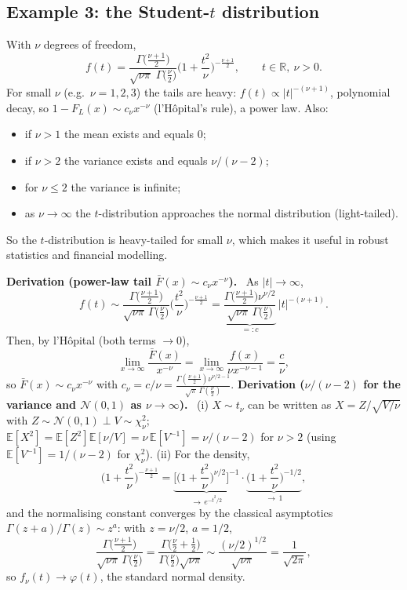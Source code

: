 \documentclass[11pt,a4paper]{article}
\newcommand{\real}{\mathbb{R}}
\newcommand{\E}{\mathbb{E}}
\newcommand{\N}{\mathcal{N}}
\newcommand{\der}[1]{\medskip\noindent\textbf{Derivation (#1).}\ }
\begin{document}
\subsection{Example 3: the Student-$t$ distribution}
With $\nu$ degrees of freedom,
\[
  f(t)=\frac{\Gamma\big(\frac{\nu+1}{2}\big)}{\sqrt{\nu\pi}\;\Gamma\big(\frac{\nu}{2}\big)}
        \Big(1+\frac{t^2}{\nu}\Big)^{-\frac{\nu+1}{2}},\qquad t\in\real,\ \nu>0 .
\]
For small $\nu$ (e.g.\ $\nu=1,2,3$) the tails are heavy: $f(t)\propto|t|^{-(\nu+1)}$, polynomial
decay, so $1-F_L(x)\sim c_\nu x^{-\nu}$ (l'H\^opital's rule), a power law. Also:
\begin{itemize}[nosep]
  \item if $\nu>1$ the mean exists and equals $0$;
  \item if $\nu>2$ the variance exists and equals $\nu/(\nu-2)$;
  \item for $\nu\le2$ the variance is infinite;
  \item as $\nu\to\infty$ the $t$-distribution approaches the normal distribution (light-tailed).
\end{itemize}
So the $t$-distribution is heavy-tailed for small $\nu$, which makes it useful in robust statistics and
financial modelling.

\der{power-law tail $\bar F(x)\sim c_\nu x^{-\nu}$}
As $|t|\to\infty$,
\[
  f(t)\sim\frac{\Gamma\big(\frac{\nu+1}{2}\big)}{\sqrt{\nu\pi}\,\Gamma\big(\frac\nu2\big)}
        \Big(\frac{t^2}{\nu}\Big)^{-\frac{\nu+1}{2}}
       =\underbrace{\frac{\Gamma\big(\frac{\nu+1}{2}\big)\nu^{\nu/2}}
                       {\sqrt{\nu\pi}\,\Gamma\big(\frac\nu2\big)}}_{=:c}
        \,|t|^{-(\nu+1)} .
\]
Then, by l'H\^opital (both terms $\to0$),
\[
  \lim_{x\to\infty}\frac{\bar F(x)}{x^{-\nu}}
   =\lim_{x\to\infty}\frac{f(x)}{\nu x^{-\nu-1}}
   =\frac{c}{\nu},
\]
so $\bar F(x)\sim c_\nu x^{-\nu}$ with $c_\nu=c/\nu
=\frac{\Gamma(\frac{\nu+1}{2})\nu^{\nu/2-1}}{\sqrt{\pi}\,\Gamma(\frac\nu2)}$.
\der{$\nu/(\nu-2)$ for the variance and $\N(0,1)$ as $\nu\to\infty$}
(i) $X\sim t_\nu$ can be written as $X=Z/\sqrt{V/\nu}$ with $Z\sim\N(0,1)\perp V\sim\chi^2_\nu$;
$\E[X^2]=\E[Z^2]\E[\nu/V]=\nu\,\E[V^{-1}]=\nu/(\nu-2)$ for $\nu>2$
(using $\E[V^{-1}]=1/(\nu-2)$ for $\chi^2_\nu$).
(ii) For the density,
\[
  \Big(1+\frac{t^2}{\nu}\Big)^{-\frac{\nu+1}{2}}
  =\underbrace{\Big[\Big(1+\frac{t^2}{\nu}\Big)^{\nu/2}\Big]^{-1}}_{\to\,e^{-t^2/2}}
   \cdot\underbrace{\Big(1+\frac{t^2}{\nu}\Big)^{-1/2}}_{\to\,1},
\]
and the normalising constant converges by the classical asymptotics
$\Gamma(z+a)/\Gamma(z)\sim z^{a}$: with $z=\nu/2$, $a=1/2$,
\[
  \frac{\Gamma\big(\frac{\nu+1}{2}\big)}{\sqrt{\nu\pi}\,\Gamma\big(\frac\nu2\big)}
  =\frac{\Gamma\big(\frac{\nu}{2}+\frac12\big)}{\Gamma\big(\frac\nu2\big)\sqrt{\nu\pi}}
  \sim\frac{(\nu/2)^{1/2}}{\sqrt{\nu\pi}}=\frac{1}{\sqrt{2\pi}},
\]
so $f_\nu(t)\to\varphi(t)$, the standard normal density.
\end{document}
